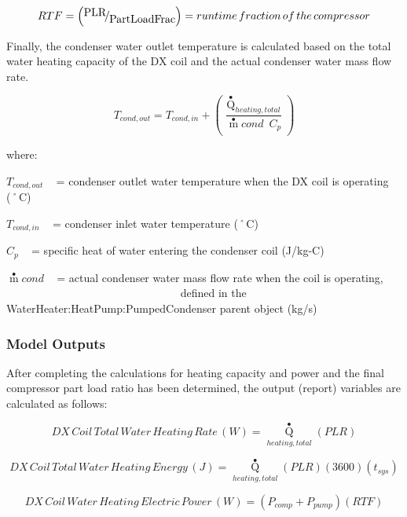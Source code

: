 \begin{equation}
RTF = \left( {{\raise0.7ex\hbox{{PLR}} \!\mathord{\left/ {\vphantom {{PLR} {PartLoadFrac}}}\right.}\!\lower0.7ex\hbox{{PartLoadFrac}}}} \right) = runtime\,fraction\,of\,the\,compressor
\end{equation}

Finally, the condenser water outlet temperature is calculated based on the total water heating capacity of the DX coil and the actual condenser water mass flow rate.

\begin{equation}
{T_{cond,out}} = {T_{cond,in}} + \left( {\frac{{{{\mathop Q\limits^ \bullet  }_{heating,total}}}}{{\mathop m\limits^ \bullet  cond\,\,\,{C_p}}}} \right)
\end{equation}

where:

\({T_{cond,out}}\) ~ = condenser outlet water temperature when the DX coil is operating (˚C)

\({T_{cond,in}}\) ~ = condenser inlet water temperature (˚C)

\({C_p}\) ~ = specific heat of water entering the condenser coil (J/kg-C)

\(\mathop m\limits^ \bullet cond\) ~ = actual condenser water mass flow rate when the coil is operating, ~~~~~~~~~~~~~~~~~~~~~~~~~~~~~~~ defined in the WaterHeater:HeatPump:PumpedCondenser parent object (kg/s)

\subsubsection{Model Outputs}\label{model-outputs-1}

After completing the calculations for heating capacity and power and the final compressor part load ratio has been determined, the output (report) variables are calculated as follows:

\begin{equation}
DX\,Coil\,Total\,Water\,Heating\,Rate\,(W) = {\mathop Q\limits^ \bullet_{heating,total}}\left( {PLR} \right)
\end{equation}

\begin{equation}
DX\,Coil\,Total\,Water\,Heating\,Energy\,(J) = {\mathop Q\limits^ \bullet_{heating,total}}\left( {PLR} \right)\left( {3600} \right)\left( {{t_{sys}}} \right)
\end{equation}

\begin{equation}
DX\,Coil\,Water\,Heating\,Electric\,Power\,(W) = \left( {{P_{comp}} + {P_{pump}}} \right)\left( {RTF} \right)
\end{equation}

